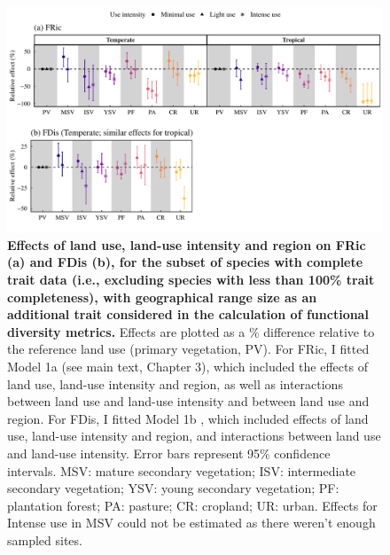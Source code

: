 \begin{figure}[h!]
\centering
\includegraphics[scale=0.7]{Supporting/Chapter3/Figures/SI_Figure19}
\caption[Effects of land use, land-use intensity and region on FRic (a) and FDis (b), for the subset of species with complete trait data, with geographical range size as an additional trait]{\textbf{Effects of land use, land-use intensity and region on FRic (a) and FDis (b), for the subset of species with complete trait data (i.e., excluding species with less than 100\% trait completeness), with geographical range size as an additional trait considered in the calculation of functional diversity metrics.} Effects are plotted as a \% difference relative to the reference land use (primary vegetation, PV). For FRic, I fitted Model 1a (see main text, Chapter 3), which included the effects of land use, land-use intensity and region, as well as interactions between land use and land-use intensity and between land use and region. For FDis, I fitted Model 1b , which included effects of land use, land-use intensity and region, and interactions between land use and land-use intensity. Error bars represent 95\% confidence intervals. MSV: mature secondary vegetation; ISV: intermediate secondary vegetation; YSV: young secondary vegetation; PF: plantation forest; PA: pasture; CR: cropland; UR: urban. Effects for Intense use in MSV could not be estimated as there weren’t enough sampled sites.}
\label{SI3_F19}
\end{figure}

